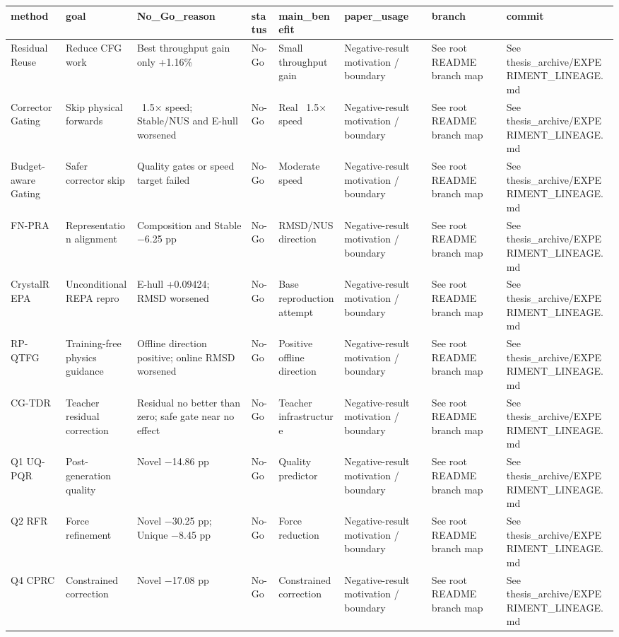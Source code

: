 \begin{tabular}{llllllll}
\toprule
method & goal & No\_Go\_reason & status & main\_benefit & paper\_usage & branch & commit \\
\midrule
Residual Reuse & Reduce CFG work & Best throughput gain only +1.16\% & No-Go & Small throughput gain & Negative-result motivation / boundary & See root README branch map & See thesis\_archive/EXPERIMENT\_LINEAGE.md \\
Corrector Gating & Skip physical forwards & ~1.5× speed; Stable/NUS and E-hull worsened & No-Go & Real ~1.5× speed & Negative-result motivation / boundary & See root README branch map & See thesis\_archive/EXPERIMENT\_LINEAGE.md \\
Budget-aware Gating & Safer corrector skip & Quality gates or speed target failed & No-Go & Moderate speed & Negative-result motivation / boundary & See root README branch map & See thesis\_archive/EXPERIMENT\_LINEAGE.md \\
FN-PRA & Representation alignment & Composition and Stable −6.25 pp & No-Go & RMSD/NUS direction & Negative-result motivation / boundary & See root README branch map & See thesis\_archive/EXPERIMENT\_LINEAGE.md \\
CrystalREPA & Unconditional REPA repro & E-hull +0.09424; RMSD worsened & No-Go & Base reproduction attempt & Negative-result motivation / boundary & See root README branch map & See thesis\_archive/EXPERIMENT\_LINEAGE.md \\
RP-QTFG & Training-free physics guidance & Offline direction positive; online RMSD worsened & No-Go & Positive offline direction & Negative-result motivation / boundary & See root README branch map & See thesis\_archive/EXPERIMENT\_LINEAGE.md \\
CG-TDR & Teacher residual correction & Residual no better than zero; safe gate near no effect & No-Go & Teacher infrastructure & Negative-result motivation / boundary & See root README branch map & See thesis\_archive/EXPERIMENT\_LINEAGE.md \\
Q1 UQ-PQR & Post-generation quality & Novel −14.86 pp & No-Go & Quality predictor & Negative-result motivation / boundary & See root README branch map & See thesis\_archive/EXPERIMENT\_LINEAGE.md \\
Q2 RFR & Force refinement & Novel −30.25 pp; Unique −8.45 pp & No-Go & Force reduction & Negative-result motivation / boundary & See root README branch map & See thesis\_archive/EXPERIMENT\_LINEAGE.md \\
Q4 CPRC & Constrained correction & Novel −17.08 pp & No-Go & Constrained correction & Negative-result motivation / boundary & See root README branch map & See thesis\_archive/EXPERIMENT\_LINEAGE.md \\

\end{tabular}
